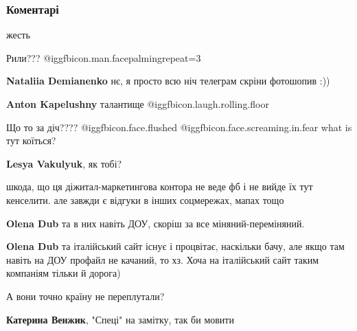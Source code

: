  
 
 
 
 
\subsubsection{Коментарі}
\label{sec:20_10_2021.fb.kapeljushnyj_anton.1.sobesedovanie_mova_programmist.cmt}

\begin{itemize} %
жесть

Рили??? @igg{fbicon.man.facepalming}{repeat=3} 

\begin{itemize} %
\textbf{Nataliia Demianenko} нє, я просто всю ніч телеграм скріни фотошопив :))

\textbf{Anton Kapelushny} талантище @igg{fbicon.laugh.rolling.floor} 
\end{itemize} %

Що то за діч????  @igg{fbicon.face.flushed}  @igg{fbicon.face.screaming.in.fear}  what is тут коїться?

\textbf{Lesya Vakulyuk}, як тобі?

шкода, що ця діжитал-маркетингова контора не веде фб і не вийде їх тут кенселити. але завжди є відгуки в інших соцмережах, мапах тощо

\begin{itemize} %
\textbf{Olena Dub} та в них навіть ДОУ, скоріш за все міняний-переміняний.

\textbf{Olena Dub} та італійський сайт існує і процвітає, наскільки бачу, але якщо там навіть на ДОУ профайл не качаний, то хз. Хоча на італійський сайт таким компаніям тільки й дорога)
\end{itemize} %

А вони точно країну не переплутали?

\textbf{Катерина Венжик}, "Спеці" на замітку, так би мовити





\end{itemize}
